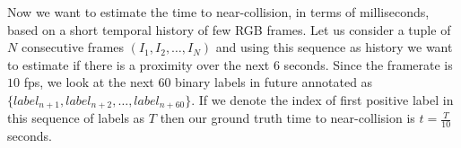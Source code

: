 
Now we want to estimate the time to near-collision, in terms of milliseconds, based on a short temporal history of few RGB frames. Let us consider a tuple of $N$ consecutive frames 
$(I_{1}, I_{2}, \hdots, I_{N})$ and using this sequence as history we want to estimate if there is a proximity over the next 6 seconds. 
Since the framerate is $10$ fps, we look at the next 60 binary labels in future annotated 
as $\{label_{n+1}, label_{n+2}, \hdots, label_{n+60}\}$. If we denote the index of first positive label in this sequence of labels as $T$ then our ground truth time to near-collision is $t = \frac{T}{10}$ seconds. 

